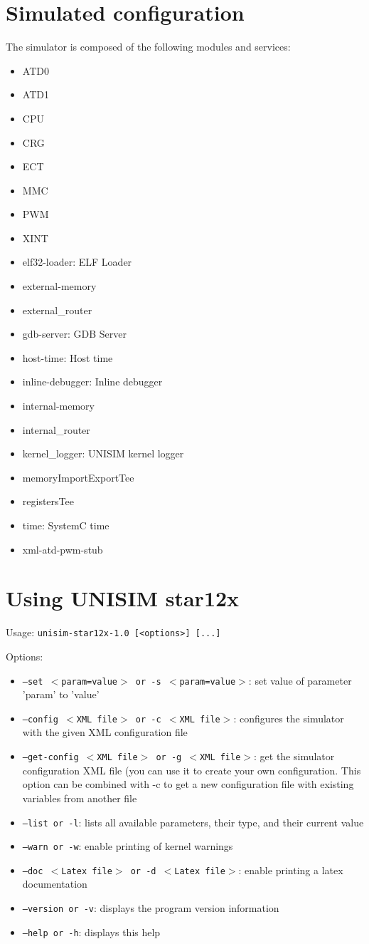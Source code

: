 \section{Simulated configuration}
\noindent The simulator is composed of the following modules and services:
\begin{itemize}\addtolength{\itemsep}{-0.40\baselineskip}
\item ATD0
\item ATD1
\item CPU
\item CRG
\item ECT
\item MMC
\item PWM
\item XINT
\item elf32-loader: ELF Loader
\item external-memory
\item external\_router
\item gdb-server: GDB Server
\item host-time: Host time
\item inline-debugger: Inline debugger
\item internal-memory
\item internal\_router
\item kernel\_logger: UNISIM kernel logger
\item memoryImportExportTee
\item registersTee
\item time: SystemC time
\item xml-atd-pwm-stub
\end{itemize}
\section{Using UNISIM star12x}
\noindent Usage: \texttt{unisim-star12x-1.0 [<options>] [...]}

\noindent Options:
\begin{itemize}
\item \texttt{--set $<$param=value$>$ or -s $<$param=value$>$}: set value of parameter 'param' to 'value'
\item \texttt{--config $<$XML file$>$ or -c $<$XML file$>$}: configures the simulator with the given XML configuration file
\item \texttt{--get-config $<$XML file$>$ or -g $<$XML file$>$}: get the simulator configuration XML file (you can use it to create your own configuration. This option can be combined with -c to get a new configuration file with existing variables from another file
\item \texttt{--list or -l}: lists all available parameters, their type, and their current value
\item \texttt{--warn or -w}: enable printing of kernel warnings
\item \texttt{--doc $<$Latex file$>$ or -d $<$Latex file$>$}: enable printing a latex documentation
\item \texttt{--version or -v}: displays the program version information
\item \texttt{--help or -h}: displays this help
\end{itemize}
